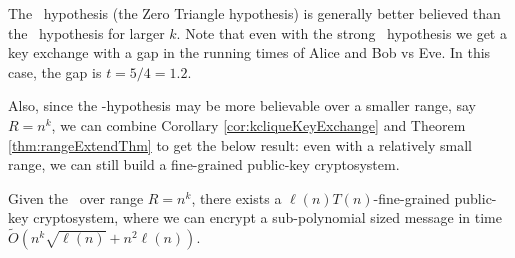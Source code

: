 The \zThclique~hypothesis (the Zero Triangle hypothesis) is generally better believed than the \zkclique~hypothesis for larger $k$. Note that even with the strong \zThclique~hypothesis we get a key exchange with a gap in the running times of Alice and Bob vs Eve. In this case, the gap is $t = 5/4 = 1.2$.

Also, since the \zkclique-hypothesis may be more believable over a smaller range, say $R = n^k$, we can combine Corollary \ref{cor:kcliqueKeyExchange} and Theorem \ref{thm:rangeExtendThm} to get the below result: even with a relatively small range, we can still build a fine-grained public-key cryptosystem.

\begin{corollary}
	Given the \strongzkc~over range $R = n^{k}$, there exists a $\ell(n)T(n)$-fine-grained public-key cryptosystem, where we can encrypt a sub-polynomial sized message in time $\tilde{O}\left(n^{k}\sqrt{\ell(n)} + n^2\ell(n)\right)$.
\end{corollary}